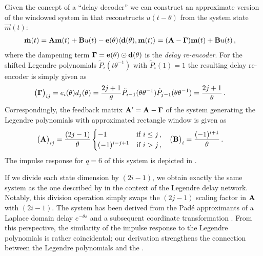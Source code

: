 Given the concept of a \enquote{delay decoder} we can construct an approximate version of the windowed \LTI system in  that reconstructs $u(t - \theta)$ from the system state $\vec m(t)$:
\begin{align}
	\dot{\mathbf{m}}(t)
		&= \mathbf{A} \mathbf{m}(t) + \mathbf{B} u(t) - \mathbf{e}(\theta) \langle \mathbf{d}(\theta), \mathbf{m}(t) \rangle
		 = (\mathbf{A} - \mathbf{\Gamma}) \mathbf{m}(t) + \mathbf{B} u(t)
	\label{eqn:information_erasure_approx} \,,
\end{align}
where the dampening term $\mathbf{\Gamma} = \mathbf{e}(\theta) \odot \mathbf{d}(\theta)$ is the \emph{delay re-encoder}.
For the shifted Legendre polynomials $\tilde P_i(t \theta^{-1})$ with $\tilde P_i(1) = 1$ the resulting delay re-encoder is simply given as
\begin{align}
	\big( \mathbf{\Gamma} \big)_{ij} &= e_i(\theta) d_j(\theta) = \frac{2j + 1}{\theta} \tilde P_{i - 1}(\theta \theta^{-1}) \tilde P_{j - 1}(\theta \theta^{-1}) = \frac{2j + 1}{\theta} \,.
	\label{eqn:legendre_delay_reencoder}
\end{align}
Correspondingly, the feedback matrix $\mathbf{A}' = \mathbf{A} - \mathbf{\Gamma}$ of the \LTI system generating the Legendre polynomials with approximated rectangle window is given as
\begin{align}
	\big( \mathbf{A} \big)_{ij} &= \frac{(2j - 1)}{\theta} \begin{cases}
		-1 & \text{if } i \leq j \,, \\
		(-1)^{i - j + 1} & \text{if } i > j  \,,\\
	\end{cases} &
	\big( \mathbf{B} \big)_i &= \frac{(-1)^{i + 1}}{\theta} \,.
	\label{eqn:ldn_system}
\end{align}
The impulse response for $q = 6$ of this system is depicted in .

If we divide each state dimension by $(2 i - 1)$, we obtain exactly the same system as the one described by \citet[Section 6.3.1, pp.~133-135]{voelker2019} in the context of the Legendre delay network.
Notably, this division operation simply swaps the $(2 j - 1)$ scaling factor in $\mathbf{A}$ with $(2 i - 1)$.
The \LDN system has been derived from the Padé approximants of a Laplace domain delay $e^{-\theta s}$ and a subsequent coordinate transformation \citep{voelker2019}.
From this perspective, the similarity of the impulse response to the Legendre polynomials is rather coincidental; our derivation strengthens the connection between the Legendre polynomials and the \LDN.


